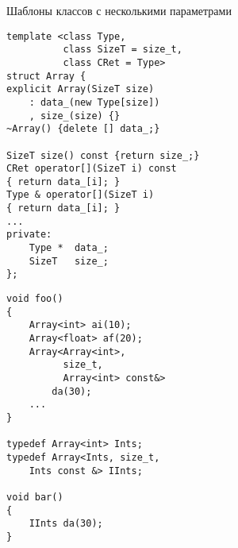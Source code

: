 \documentclass{beamer}
\begin{document}
\begin{frame}[fragile]{Шаблоны классов с несколькими параметрами}
\small
\begin{minipage}{.5\textwidth}
    \begin{lstlisting}
template <class Type, 
          class SizeT = size_t, 
          class CRet = Type>
struct Array {                               
explicit Array(SizeT size)      
    : data_(new Type[size])     
    , size_(size) {}                                                              
~Array() {delete [] data_;}            

SizeT size() const {return size_;}               
CRet operator[](SizeT i) const 
{ return data_[i]; }            
Type & operator[](SizeT i)      
{ return data_[i]; }            
...                             
private:                        
    Type *  data_;              
    SizeT   size_;              
};
    \end{lstlisting}
\end{minipage}\hspace{.03\textwidth}%
\begin{minipage}{.45\textwidth}
    \begin{lstlisting}
void foo()
{
    Array<int> ai(10);
    Array<float> af(20);
    Array<Array<int>, 
          size_t, 
          Array<int> const&> 
        da(30);
    ...
}

typedef Array<int> Ints;
typedef Array<Ints, size_t, 
    Ints const &> IInts;

void bar()
{
    IInts da(30);
}

    \end{lstlisting}
\end{minipage}
\end{frame}
\end{document}

